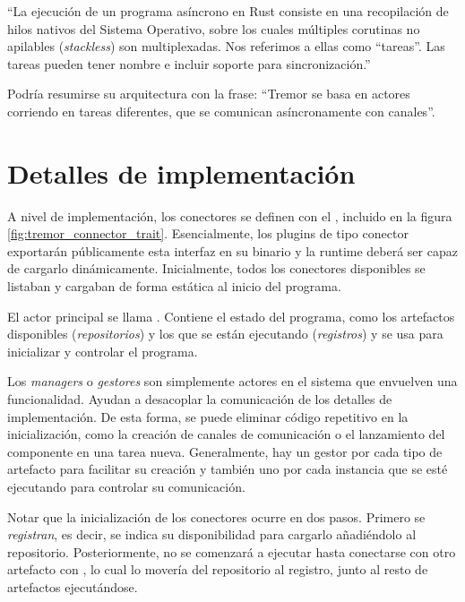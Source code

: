 ``La ejecución de un programa asíncrono en Rust consiste en una recopilación de
hilos nativos del Sistema Operativo, sobre los cuales múltiples corutinas no
apilables (\emph{stackless}) son multiplexadas. Nos referimos a ellas como
``tareas''. Las tareas pueden tener nombre e incluir soporte para
sincronización.''~\cite{asyncstd_task}

Podría resumirse su arquitectura con la frase: ``Tremor se basa en actores
corriendo en tareas diferentes, que se comunican asíncronamente con canales''.

\section{Detalles de implementación}

A nivel de implementación, los conectores se definen con el \trait
{}, incluido en la figura \ref{fig:tremor_connector_trait}.
Esencialmente, los plugins de tipo conector exportarán públicamente esta
interfaz en su binario y la runtime deberá ser capaz de cargarlo dinámicamente.
Inicialmente, todos los conectores disponibles se listaban y cargaban de forma
estática al inicio del programa.

El actor principal se llama . Contiene el estado del programa, como
los artefactos disponibles (\emph{repositorios}) y los que se están ejecutando
(\emph{registros}) y se usa para inicializar y controlar el programa.

Los \emph{managers} o \emph{gestores} son simplemente actores en el sistema que
envuelven una funcionalidad. Ayudan a desacoplar la comunicación de los detalles
de implementación. De esta forma, se puede eliminar código repetitivo en la
inicialización, como la creación de canales de comunicación o el lanzamiento del
componente en una tarea nueva. Generalmente, hay un gestor por cada tipo de
artefacto para facilitar su creación y también uno por cada instancia que se
esté ejecutando para controlar su comunicación.

Notar que la inicialización de los conectores ocurre en dos pasos. Primero se
\emph{registran}, es decir, se indica su disponibilidad para cargarlo
añadiéndolo al repositorio. Posteriormente, no se comenzará a ejecutar hasta
conectarse con otro artefacto con , lo cual lo movería del
repositorio al registro, junto al resto de artefactos ejecutándose.

